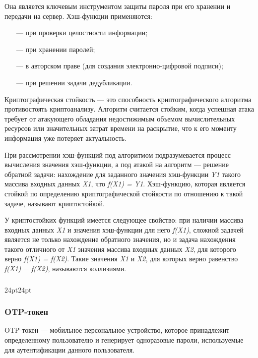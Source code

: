 Она является ключевым инструментом защиты пароля при его хранении и передачи на сервер. 
Хэш-функции применяются:
\begin{itemize}
    \item[---] при проверки целостности информации;
    \item[---] при хранении паролей;
    \item[---] в авторском праве (для создания электронно-цифровой подписи);
    \item[---] при решении задачи дедубликации.
\end{itemize}

\clearpage

Криптографическая стойкость \cite{bib5} --- это способность криптографического алгоритма противостоять криптоанализу. Алгоритм считается стойким, когда успешная атака требует от атакующего обладания недостижимым объемом вычислительных ресурсов или значительных затрат времени на раскрытие, что к его моменту информация уже потеряет актуальность.

При рассмотрении хэш-функций под алгоритмом подразумевается процесс вычисления значения хэш-функции, а под атакой на алгоритм --- решение обратной задачи: нахождение для заданного значения хэш-функции \textit{Y1} такого массива входных данных \textit{X1}, что \textit{f(X1) = Y1}. Хэш-функцию, которая является стойкой по определению криптографической стойкости по отношению к такой задаче, называют криптостойкой.

У криптостойких функций имеется следующее свойство: при наличии массива входных данных \textit{X1} и значения хэш-функции для него \textit{f(X1)}, сложной задачей является не только нахождение обратного значения, но и задача нахождения такого отличного от \textit{X1} значения массива входных данных \textit{X2}, для которого верно \textit{f(X1) = f(X2)}. Такие значения \textit{X1} и \textit{X2}, для которых верно равенство \textit{f(X1) = f(X2)}, называются коллизиями.



\titlespacing\subsubsection{\parindent}{24pt}{24pt}
\subsubsection{OTP-токен}
OTP-токен \cite{bib2} --- мобильное персональное устройство, которое принадлежит определенному пользователю и генерирует одноразовые пароли, используемые для аутентификации данного пользователя.

